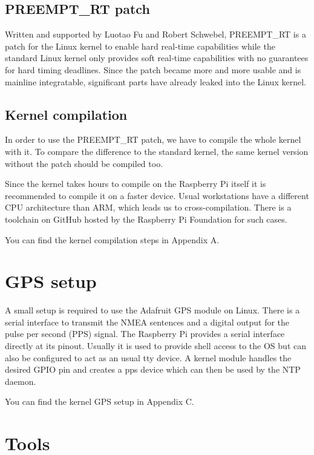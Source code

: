 \subsection{PREEMPT\_RT patch}

Written and supported by Luotao Fu and Robert Schwebel, PREEMPT\_RT is a patch for the Linux kernel to enable hard real-time capabilities while the standard Linux kernel only provides soft real-time capabilities with no guarantees for hard timing deadlines.\cite{preempt} Since the patch became more and more usable and is mainline integratable, significant parts have already leaked into the Linux kernel.

\subsection{Kernel compilation}

In order to use the PREEMPT\_RT patch, we have to compile the whole kernel with it. To compare the difference to the standard kernel, the same kernel version without the patch should be compiled too.

Since the kernel takes hours to compile on the Raspberry Pi itself it is recommended to compile it on a faster device. Usual workstations have a different CPU architecture than ARM, which leads us to cross-compilation. There is a toolchain on GitHub hosted by the Raspberry Pi Foundation for such cases.

You can find the kernel compilation steps in Appendix A.

\section{GPS setup}

A small setup is required to use the Adafruit GPS module on Linux. There is a serial interface to transmit the NMEA sentences and a digital output for the pulse per second (PPS) signal. The Raspberry Pi provides a serial interface directly at its pinout. Usually it is used to provide shell access to the OS but can also be configured to act as an usual tty device. A kernel module handles the desired GPIO pin and creates a pps device which can then be used by the NTP daemon.

You can find the kernel GPS setup in Appendix C.

\section{Tools}

